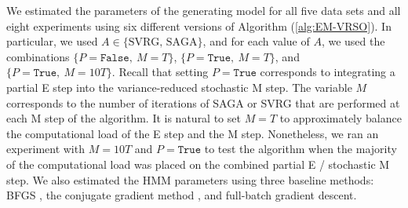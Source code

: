 We estimated the parameters of the generating model for all five data sets and all eight experiments using six different versions of Algorithm (\ref{alg:EM-VRSO}). In particular, we used $A \in \{\text{SVRG, SAGA}\}$, and for each value of $A$, we used the combinations $\{P = \texttt{False}, ~ M = T\}$, $\{P = \texttt{True}, ~ M = T\}$, and $\{P = \texttt{True}, ~ M = 10T\}$. Recall that setting $P = \texttt{True}$ corresponds to integrating a partial E step into the variance-reduced stochastic M step. The variable $M$ corresponds to the number of iterations of SAGA or SVRG that are performed at each M step of the algorithm. It is natural to set $M=T$ to approximately balance the computational load of the E step and the M step. Nonetheless, we ran an experiment with $M=10T$ and $P = \texttt{True}$ to test the algorithm when the majority of the computational load was placed on the combined partial E / stochastic M step. We also estimated the HMM parameters using three baseline methods: BFGS \citep{Fletcher:2000}, the conjugate gradient method \citep{Fletcher:1964}, and full-batch gradient descent. 

